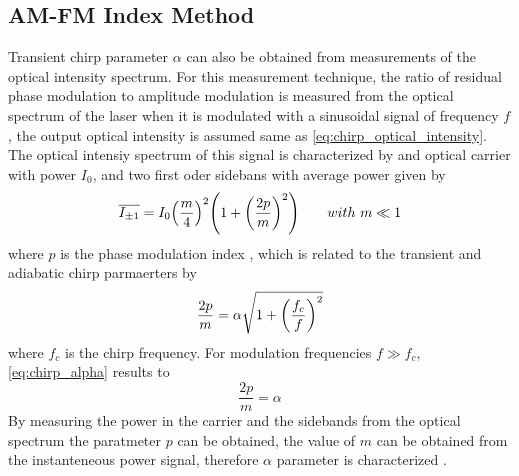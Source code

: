 \subsection{AM-FM Index Method}
Transient chirp parameter $\alpha$ can also be obtained from measurements of the optical intensity spectrum. For this measurement technique, the ratio of residual phase modulation to amplitude modulation is measured from the optical spectrum of the laser when it is modulated with a sinusoidal signal of frequency $f$, the output optical intensity is assumed same as \autoref{eq:chirp_optical_intensity}. The optical intensiy spectrum of this signal is characterized by and optical carrier with power $I_0$, and two first oder sidebans with average power given by \cite{harder1983measurement}
\begin{equation}
    \overline{I_{\pm 1}}=I_0\qty(\frac{m}{4})^2\qty(1+\qty(\frac{2p}{m})^2) \qquad with \ m \ll 1
\end{equation}
where $p$ is the phase modulation index \cite{harder1983measurement}, which is related to the transient and adiabatic chirp parmaerters by \cite{bjerkan1996measurement}
\begin{equation}
    \frac{2p}{m}=\alpha\sqrt{1+\qty(\frac{f_c}{f})^2}
    \label{eq:chirp_alpha}
\end{equation}
where $f_c$ is the chirp frequency. For modulation frequencies $f \gg f_c$, \autoref{eq:chirp_alpha} results to \cite{harder1983measurement}
\begin{equation}
    \frac{2p}{m}=\alpha
    \label{eq:chirp_alpha_2}
\end{equation}
By measuring the power in the carrier and the sidebands from the optical spectrum the paratmeter $p$ can be obtained, the value of $m$ can be obtained from the instanteneous power signal, therefore $\alpha$ parameter is characterized \cite{harder1983measurement, villafranca2007precise}.

